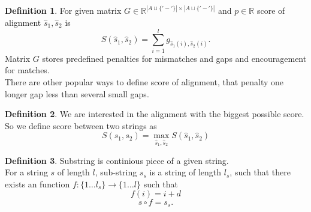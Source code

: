 \documentclass[a4paper, 12pt]{article}
\theoremstyle{definition}
\newtheorem{definition}{Definition}[section]
\theoremstyle{definition}
\newtheorem{theorem}{Theorem}
\theoremstyle{remark}
\begin{document}
\begin{definition}
    
    For given matrix $G \in \mathbb{R}^{|A \sqcup \{ '-' \} | \times |A \sqcup \{ '-' \}|}$ and $p \in \mathbb{R}$ 
    score of alignment $\hat{s}_1, \hat{s}_2$ is 
    $$ S(\hat{s}_1, \hat{s}_2) = \sum_{i = 1}^l g_{\hat{s}_1(i), \hat{s}_2(i)}. $$
    Matrix $G$ stores predefined penalties for mismatches and 
    gaps and encouragement for matches. \\
    
    There are other popular ways to define score of alignment, 
    that penalty one longer gap less than several small gaps. 
       
\end{definition}



    

\begin{definition}
    We are interested in the alignment with the biggest possible score. 
    So we define score between two strings as 
    $$ S(s_1, s_2) = \max_{\hat{s}_1, \hat{s}_2} S(\hat{s}_1, \hat{s}_2 )$$ 
\end{definition}

\begin{definition}
    Substring is continious piece of a given string.\\
    For a string $s$ of length $l$, sub-string $s_s$ 
    is a string of length $l_s$, such that there exists an function
    $f: \{ 1 \ldots l_s \} \rightarrow \{ 1 \ldots l\}$
    such that
    $$ f(i) = i + d $$
    $$s \circ f = s_s.$$
\end{definition}
\end{document}
